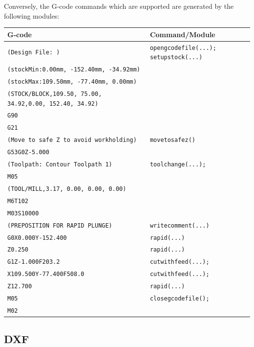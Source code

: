 \documentclass{ltxdoc}
\begin{document}


\noindent Conversely, the G-code commands which are supported are generated by the following modules:

\bigskip

\noindent \begin{tabular}{@{}ll@{}} \toprule
 G-code                                                           & Command/Module \\ \midrule
 \verb|(Design File: )| &  \texttt{opengcodefile(...);}
                           \texttt{setupstock(...)}\\
 \verb|(stockMin:0.00mm, -152.40mm, -34.92mm)| \\
 \verb|(stockMax:109.50mm, -77.40mm, 0.00mm)| \\
 \verb|(STOCK/BLOCK,109.50, 75.00, 34.92,0.00, 152.40, 34.92)| \\
 \verb|G90| \\
 \verb|G21| \\ \midrule
 \verb|(Move to safe Z to avoid workholding)| &  \texttt{movetosafez()} \\
 \verb|G53G0Z-5.000| \\ \midrule
 \verb|(Toolpath: Contour Toolpath 1)| &  \texttt{toolchange(...);}\\
 \verb|M05| \\
 \verb|(TOOL/MILL,3.17, 0.00, 0.00, 0.00)| \\
 \verb|M6T102| \\
 \verb|M03S10000|  \\ \midrule
 \verb|(PREPOSITION FOR RAPID PLUNGE)| & \texttt{writecomment(...)}\\ \midrule
 \verb|G0X0.000Y-152.400| & \texttt{rapid(...)}\\
 \verb|Z0.250| & \texttt{rapid(...)}\\ \midrule
 \verb|G1Z-1.000F203.2| & \texttt{cutwithfeed(...);}\\ 
 \verb|X109.500Y-77.400F508.0| & \texttt{cutwithfeed(...);} \\ \midrule
 \verb|Z12.700| & \texttt{rapid(...)} \\ \midrule
 \verb|M05| &  \texttt{closegcodefile();}\\
 \verb|M02|\\
 \bottomrule
 \end{tabular}
\bigskip

\subsection{DXF}
\end{document}
